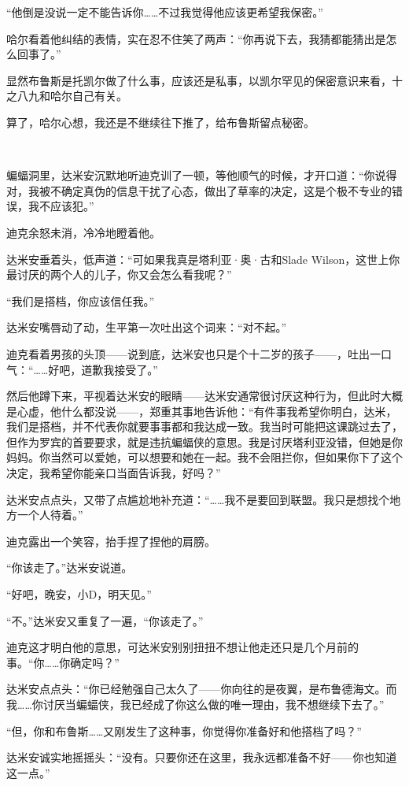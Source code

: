 \documentclass[../main]{subfiles}
\begin{document}
“他倒是没说一定不能告诉你……不过我觉得他应该更希望我保密。”

哈尔看着他纠结的表情，实在忍不住笑了两声：“你再说下去，我猜都能猜出是怎么回事了。”

显然布鲁斯是托凯尔做了什么事，应该还是私事，以凯尔罕见的保密意识来看，十之八九和哈尔自己有关。

算了，哈尔心想，我还是不继续往下推了，给布鲁斯留点秘密。

~\

蝙蝠洞里，达米安沉默地听迪克训了一顿，等他顺气的时候，才开口道：“你说得对，我被不确定真伪的信息干扰了心态，做出了草率的决定，这是个极不专业的错误，我不应该犯。”

迪克余怒未消，冷冷地瞪着他。

达米安垂着头，低声道：“可如果我真是塔利亚·奥·古和Slade
Wilson，这世上你最讨厌的两个人的儿子，你又会怎么看我呢？”

“我们是搭档，你应该信任我。”

达米安嘴唇动了动，生平第一次吐出这个词来：“对不起。”

迪克看着男孩的头顶——说到底，达米安也只是个十二岁的孩子——，吐出一口气：“……好吧，道歉我接受了。”

然后他蹲下来，平视着达米安的眼睛——达米安通常很讨厌这种行为，但此时大概是心虚，他什么都没说——，郑重其事地告诉他：“有件事我希望你明白，达米，我们是搭档，并不代表你就要事事都和我达成一致。我当时可能把这课跳过去了，但作为罗宾的首要要求，就是违抗蝙蝠侠的意思。我是讨厌塔利亚没错，但她是你妈妈。你当然可以爱她，可以想要和她在一起。我不会阻拦你，但如果你下了这个决定，我希望你能亲口当面告诉我，好吗？”

达米安点点头，又带了点尴尬地补充道：“……我不是要回到联盟。我只是想找个地方一个人待着。”

迪克露出一个笑容，抬手捏了捏他的肩膀。

“你该走了。”达米安说道。

“好吧，晚安，小D，明天见。”

“不。”达米安又重复了一遍，“你该走了。”

迪克这才明白他的意思，可达米安别别扭扭不想让他走还只是几个月前的事。“你……你确定吗？”

达米安点点头：“你已经勉强自己太久了——你向往的是夜翼，是布鲁德海文。而我……你讨厌当蝙蝠侠，我已经成了你这么做的唯一理由，我不想继续下去了。”

“但，你和布鲁斯……又刚发生了这种事，你觉得你准备好和他搭档了吗？”

达米安诚实地摇摇头：“没有。只要你还在这里，我永远都准备不好——你也知道这一点。”
\end{document}
